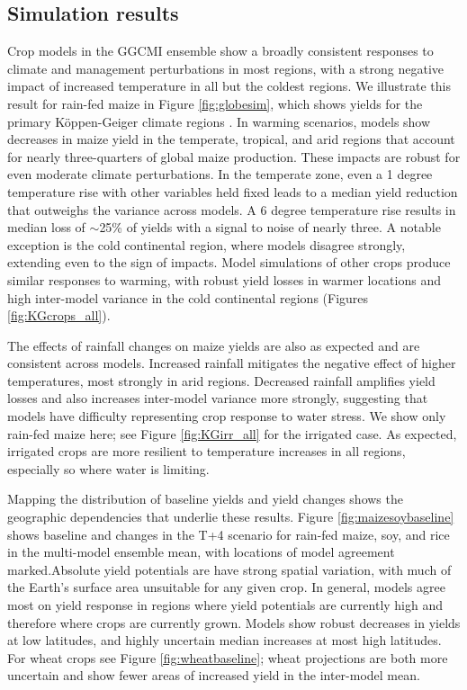 \documentclass[preprint, 5p, times, twocolumn]{elsarticle}
\begin{document}
\subsection{Simulation results}
Crop models in the GGCMI ensemble show a broadly consistent responses to climate and management perturbations in most regions, with a strong negative impact of increased temperature in all but the coldest regions. We illustrate this result for rain-fed maize in Figure \ref{fig:globesim}, which shows yields for the primary K\"{o}ppen-Geiger climate regions \citep{rubel2010}. 
In warming scenarios, models show decreases in maize yield in the temperate, tropical, and arid regions that account for nearly three-quarters of global maize production. These impacts are robust for even moderate climate perturbations. In the temperate zone, even a 1 degree temperature rise with other variables held fixed leads to a median yield reduction that outweighs the variance across models. A 6 degree temperature rise results in median loss of $\sim$25\% of yields with a signal to noise of nearly three. A notable exception is the cold continental region, where models disagree strongly, extending even to the sign of impacts. Model simulations of other crops produce similar responses to warming, with robust yield losses in warmer locations and high inter-model variance in the cold continental regions (Figures \ref{fig:KGcrops_all}).

The effects of rainfall changes on maize yields are also as expected and are consistent across models. Increased rainfall mitigates the negative effect of higher temperatures, most strongly in arid regions. Decreased rainfall amplifies yield losses and also increases inter-model variance more strongly, suggesting that models have difficulty representing crop response to water stress.  We show only rain-fed maize here; see Figure \ref{fig:KGirr_all} for the irrigated case. As expected, irrigated crops are more resilient to temperature increases in all regions, especially so where water is limiting.  

Mapping the distribution of baseline yields and yield changes shows the geographic dependencies that underlie these results. Figure \ref{fig:maizesoybaseline} shows baseline and changes in the T+4 scenario for rain-fed maize, soy, and rice in the multi-model ensemble mean, with locations of model agreement marked.Absolute yield potentials are have strong spatial variation, with much of the Earth's surface area unsuitable for any given crop. In general, models agree most on yield response in regions where yield potentials are currently high and therefore where crops are currently grown. Models show robust decreases in yields at low latitudes, and highly uncertain median increases at most high latitudes. For wheat crops see Figure \ref{fig:wheatbaseline}; wheat projections are both more uncertain and show fewer areas of increased yield in the inter-model mean. 
\end{document}
